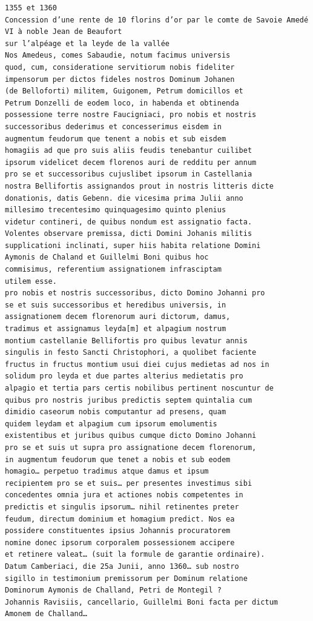 \documentclass[a4paper,twoside,openany]{article}
\begin{document}
\begin{Verbatim}
1355 et 1360
Concession d’une rente de 10 florins d’or par le comte de Savoie Amedé VI à noble Jean de Beaufort
sur l’alpéage et la leyde de la vallée
Nos Amedeus, comes Sabaudie, notum facimus universis
quod, cum, consideratione servitiorum nobis fideliter
impensorum per dictos fideles nostros Dominum Johanen
(de Belloforti) militem, Guigonem, Petrum domicillos et
Petrum Donzelli de eodem loco, in habenda et obtinenda
possessione terre nostre Faucigniaci, pro nobis et nostris
successoribus dederimus et concesserimus eisdem in
augmentum feudorum que tenent a nobis et sub eisdem
homagiis ad que pro suis aliis feudis tenebantur cuilibet
ipsorum videlicet decem florenos auri de redditu per annum
pro se et successoribus cujuslibet ipsorum in Castellania
nostra Bellifortis assignandos prout in nostris litteris dicte
donationis, datis Gebenn. die vicesima prima Julii anno
millesimo trecentesimo quinquagesimo quinto plenius
videtur contineri, de quibus nondum est assignatio facta.
Volentes observare premissa, dicti Domini Johanis militis
supplicationi inclinati, super hiis habita relatione Domini
Aymonis de Chaland et Guillelmi Boni quibus hoc
commisimus, referentium assignationem infrasciptam
utilem esse.
pro nobis et nostris successoribus, dicto Domino Johanni pro
se et suis successoribus et heredibus universis, in
assignationem decem florenorum auri dictorum, damus,
tradimus et assignamus leyda[m] et alpagium nostrum
montium castellanie Bellifortis pro quibus levatur annis
singulis in festo Sancti Christophori, a quolibet faciente
fructus in fructus montium usui diei cujus medietas ad nos in
solidum pro leyda et due partes alterius medietatis pro
alpagio et tertia pars certis nobilibus pertinent noscuntur de
quibus pro nostris juribus predictis septem quintalia cum
dimidio caseorum nobis computantur ad presens, quam
quidem leydam et alpagium cum ipsorum emolumentis
existentibus et juribus quibus cumque dicto Domino Johanni
pro se et suis ut supra pro assignatione decem florenorum,
in augmentum feudorum que tenet a nobis et sub eodem
homagio… perpetuo tradimus atque damus et ipsum
recipientem pro se et suis… per presentes investimus sibi
concedentes omnia jura et actiones nobis competentes in
predictis et singulis ipsorum… nihil retinentes preter
feudum, directum dominium et homagium predict. Nos ea
possidere constituentes ipsius Johannis procuratorem
nomine donec ipsorum corporalem possessionem accipere
et retinere valeat… (suit la formule de garantie ordinaire).
Datum Camberiaci, die 25a Junii, anno 1360… sub nostro
sigillo in testimonium premissorum per Dominum relatione
Dominorum Aymonis de Challand, Petri de Montegil ?
Johannis Ravisiis, cancellario, Guillelmi Boni facta per dictum
Amonem de Challand…
\end{Verbatim}
\end{document}
